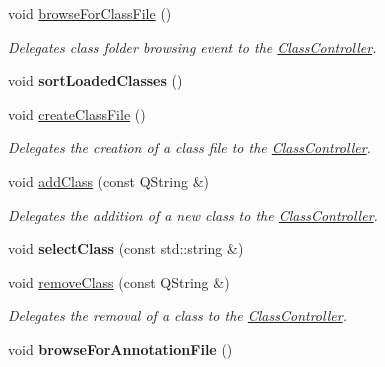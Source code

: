 \begin{DoxyCompactItemize}
\mbox{\label{classMainController_aa717950c16ef5d01ab4edf77a9a27f82}} 
void \hyperlink{classMainController_aa717950c16ef5d01ab4edf77a9a27f82}{browse\+For\+Class\+File} ()
\begin{DoxyCompactList}\small\item\em Delegates class folder browsing event to the \hyperlink{classClassController}{Class\+Controller}. \end{DoxyCompactList}\item 
\mbox{\label{classMainController_a082a8c3ba40b0303d3e28757134a6cfa}} 
void {\bfseries sort\+Loaded\+Classes} ()
\item 
\mbox{\label{classMainController_a6cdee58a8c4ed59ab9a05ab5a15456a6}} 
void \hyperlink{classMainController_a6cdee58a8c4ed59ab9a05ab5a15456a6}{create\+Class\+File} ()
\begin{DoxyCompactList}\small\item\em Delegates the creation of a class file to the \hyperlink{classClassController}{Class\+Controller}. \end{DoxyCompactList}\item 
void \hyperlink{classMainController_aede8e00b0ad8f75018f6b62e1cb5e301}{add\+Class} (const Q\+String \&)
\begin{DoxyCompactList}\small\item\em Delegates the addition of a new class to the \hyperlink{classClassController}{Class\+Controller}. \end{DoxyCompactList}\item 
\mbox{\label{classMainController_a8a0f5b26e0037dc3ec3abe885b199370}} 
void {\bfseries select\+Class} (const std\+::string \&)
\item 
void \hyperlink{classMainController_ad639a2fd588d6fe011701a5168184883}{remove\+Class} (const Q\+String \&)
\begin{DoxyCompactList}\small\item\em Delegates the removal of a class to the \hyperlink{classClassController}{Class\+Controller}. \end{DoxyCompactList}\item 
\mbox{\label{classMainController_a018730fa763bed9ef77bb7c2fc994bb8}} 
void {\bfseries browse\+For\+Annotation\+File} ()

\end{DoxyCompactItemize}
